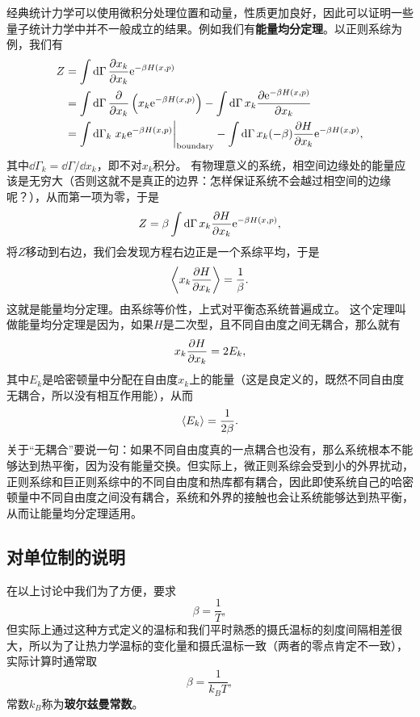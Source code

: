 \documentclass[hyperref, UTF8, a4paper]{ctexart}
\newcommand*{\ee}{\mathrm{e}}
\begin{document}
经典统计力学可以使用微积分处理位置和动量，性质更加良好，因此可以证明一些量子统计力学中并不一般成立的结果。例如我们有\textbf{能量均分定理}。以正则系综为例，我们有
\[
    \begin{aligned}
        Z &= \int \dd{\Gamma} \pdv{x_k}{x_k} \ee^{- \beta H(x, p)} \\
        &= \int \dd{\Gamma} \pdv{x_k} \left(x_k \ee^{- \beta H(x, p)}\right) - \int \dd{\Gamma} x_k \pdv{\ee^{- \beta H(x, p)}}{x_k} \\
        &= \int \dd{\Gamma_k} \eval{x_k \ee^{- \beta H(x, p)}}_\text{boundary} - \int \dd{\Gamma} x_k ( - \beta) \pdv{H}{x_k} \ee^{- \beta H(x, p)},
    \end{aligned}
\]
其中$\dd{\Gamma_k}=\dd{\Gamma}/\dd{x_k}$，即不对$x_k$积分。
有物理意义的系统，相空间边缘处的能量应该是无穷大（否则这就不是真正的边界：怎样保证系统不会越过相空间的边缘呢？），从而第一项为零，于是
\[
    Z = \beta \int \dd{\Gamma} x_k \pdv{H}{x_k} \ee^{-\beta H(x, p)},
\] 
将$Z$移动到右边，我们会发现方程右边正是一个系综平均，于是
\begin{equation}
    \expval{x_k \pdv{H}{x_k}} = \frac{1}{\beta}.
\end{equation}
这就是能量均分定理。由系综等价性，上式对平衡态系统普遍成立。
这个定理叫做能量均分定理是因为，如果$H$是二次型，且不同自由度之间无耦合，那么就有
\[
    x_k \pdv{H}{x_k} = 2 E_k,
\]
其中$E_k$是哈密顿量中分配在自由度$x_k$上的能量（这是良定义的，既然不同自由度无耦合，所以没有相互作用能），从而
\begin{equation}
    \expval{E_k} = \frac{1}{2\beta}.
\end{equation}
关于“无耦合”要说一句：如果不同自由度真的一点耦合也没有，那么系统根本不能够达到热平衡，因为没有能量交换。但实际上，微正则系综会受到小的外界扰动，正则系综和巨正则系综中的不同自由度和热库都有耦合，因此即使系统自己的哈密顿量中不同自由度之间没有耦合，系统和外界的接触也会让系统能够达到热平衡，从而让能量均分定理适用。

\subsection{对单位制的说明}

在以上讨论中我们为了方便，要求
\[
    \beta = \frac{1}{T},
\]
但实际上通过这种方式定义的温标和我们平时熟悉的摄氏温标的刻度间隔相差很大，所以为了让热力学温标的变化量和摄氏温标一致（两者的零点肯定不一致），实际计算时通常取
\begin{equation}
    \beta = \frac{1}{k_B T},
\end{equation}
常数$k_B$称为\textbf{玻尔兹曼常数}。
\end{document}
